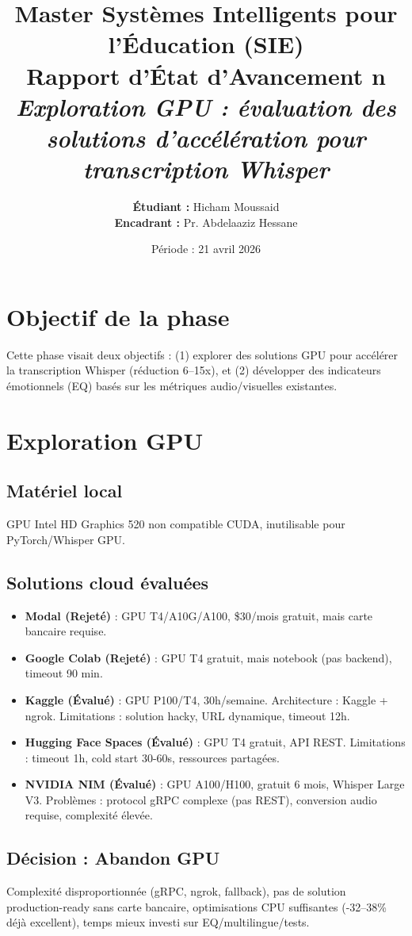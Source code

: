 \documentclass[12pt,a4paper]{article}
\title{
    \vspace{-2cm}
    \large Master Systèmes Intelligents pour l'Éducation (SIE)\\
    \vspace{0.5cm}
    \huge \textbf{Rapport d'État d'Avancement n\textdegree5}\\
    \large \textit{Exploration GPU : évaluation des solutions d'accélération pour transcription Whisper}
}
\author{\textbf{Étudiant :} Hicham Moussaid \\ \textbf{Encadrant :} Pr. Abdelaaziz Hessane}
\date{Période : 21 avril 2026}
\begin{document}
\maketitle

\section{Objectif de la phase}
Cette phase visait deux objectifs : (1) explorer des solutions GPU pour accélérer la transcription Whisper (réduction 6--15x), et (2) développer des indicateurs émotionnels (EQ) basés sur les métriques audio/visuelles existantes.

\section{Exploration GPU}

\subsection{Matériel local}
GPU Intel HD Graphics 520 non compatible CUDA, inutilisable pour PyTorch/Whisper GPU.

\subsection{Solutions cloud évaluées}
\begin{itemize}
    \item \textbf{Modal (Rejeté)} : GPU T4/A10G/A100, \$30/mois gratuit, mais carte bancaire requise.
    \item \textbf{Google Colab (Rejeté)} : GPU T4 gratuit, mais notebook (pas backend), timeout 90 min.
    \item \textbf{Kaggle (Évalué)} : GPU P100/T4, 30h/semaine. Architecture : Kaggle + ngrok. Limitations : solution hacky, URL dynamique, timeout 12h.
    \item \textbf{Hugging Face Spaces (Évalué)} : GPU T4 gratuit, API REST. Limitations : timeout 1h, cold start 30-60s, ressources partagées.
    \item \textbf{NVIDIA NIM (Évalué)} : GPU A100/H100, gratuit 6 mois, Whisper Large V3. Problèmes : protocol gRPC complexe (pas REST), conversion audio requise, complexité élevée.
\end{itemize}

\subsection{Décision : Abandon GPU}
Complexité disproportionnée (gRPC, ngrok, fallback), pas de solution production-ready sans carte bancaire, optimisations CPU suffisantes (-32--38\% déjà excellent), temps mieux investi sur EQ/multilingue/tests.
\end{document}

